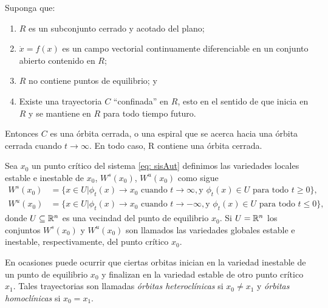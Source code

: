 \begin{teo}\label{teo: poincareB}
	Suponga que:
	\begin{enumerate}
		\item $R$ es un subconjunto cerrado y acotado del plano;
		\item $\dot{x} = f(x)$ es un campo vectorial continuamente diferenciable en un conjunto abierto contenido en $R$;
		\item $R$ no contiene puntos de equilibrio; y
		\item Existe una trayectoria $C$ ``confinada'' en $R$, esto en el sentido de que inicia en $R$ y se mantiene en $R$ para todo tiempo futuro. 
	\end{enumerate}
	Entonces $C$ es una órbita cerrada, o una espiral que se acerca hacia una órbita cerrada cuando $t \rightarrow \infty$. En todo caso, R contiene una órbita cerrada.
\end{teo}

\begin{defi}
	Sea $x_{0}$ un punto crítico del sistema \eqref{eq: sisAut} definimos las variedades locales estable e inestable de $x_{0}$, $W^{s}(x_{0})$, $W^{u}(x_{0})$ como sigue
	\begin{equation*}
		\begin{aligned}
			W^{s}(x_{0}) &= \{ x\in U | \phi_{t}(x) \rightarrow x_{0} \text{ cuando } t\rightarrow \infty, \text{y } \phi_{t}(x)\in U \text{ para todo } t\geq 0 \}, \\
			W^{u}(x_{0}) &= \{ x\in U | \phi_{t}(x) \rightarrow x_{0} \text{ cuando } t\rightarrow -\infty, \text{y } \phi_{t}(x)\in U \text{ para todo } t \leq 0 \},
		\end{aligned}
	\end{equation*}
	donde $U \subseteq {\mathbb{R}}^{n}$ es una vecindad del punto de equilibrio $x_{0}$. Si $U = {\mathbb{R}}^{n}$ los conjuntos $W^{s}(x_{0})$ y $W^{u}(x_{0})$ son llamados las variedades globales estable e inestable, respectivamente, del punto crítico $x_{0}$. 
\end{defi}

En ocasiones puede ocurrir que ciertas orbitas inician en la variedad inestable de un punto de equilibrio $x_{0}$ y finalizan en la variedad estable de otro punto crítico $x_{1}$. Tales trayectorias son llamadas \textit{órbitas heteroclínicas} si $x_{0} \neq x_{1}$ y \textit{órbitas homoclínicas} si $x_{0} = x_{1}$.

